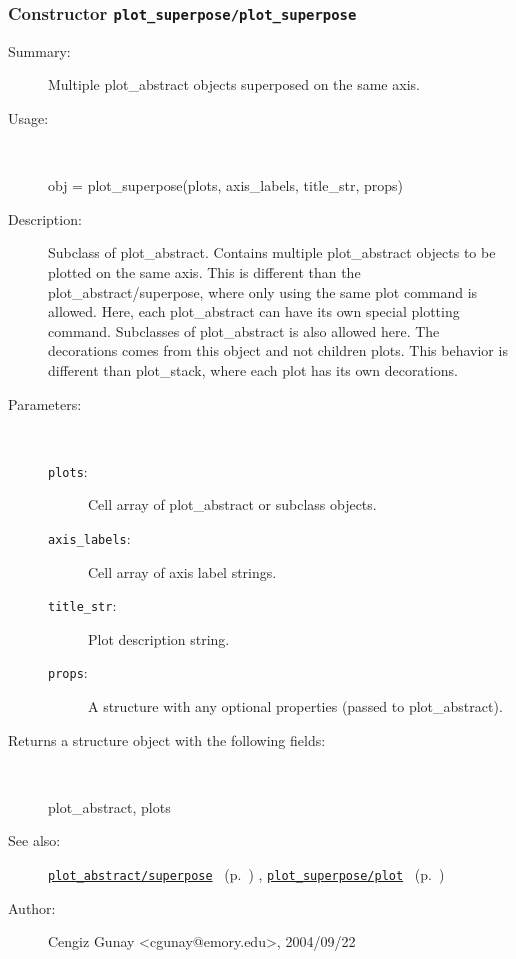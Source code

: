 \subsubsection[Constructor \texttt{plot\_superpose}]{Constructor \texttt{plot\_superpose/plot\_superpose}}%
%
\label{ref_plot_superpose__plot_superpose}%
\hypertarget{ref_plot_superpose__plot_superpose}{}%
\begin{description}
\item[Summary:]Multiple plot\_abstract objects superposed on the same axis.
%
\item[Usage:]~%
\begin{lyxcode}%
obj = plot\_superpose(plots, axis\_labels, title\_str, props)
%
\end{lyxcode}%
%
\item[Description:]%
Subclass of plot\_abstract. Contains multiple plot\_abstract objects
 to be plotted on the same axis. This is different than the 
 plot\_abstract/superpose, where only using the same plot command is allowed.
 Here, each plot\_abstract can have its own special plotting command. Subclasses
 of plot\_abstract is also allowed here. The decorations comes from this object
 and not children plots. This behavior is different than plot\_stack, where
 each plot has its own decorations.
\item[Parameters:]~
\begin{description}%
\item[\texttt{plots}:]
 Cell array of plot\_abstract or subclass objects.
\item[\texttt{axis\_labels}:]
 Cell array of axis label strings.
\item[\texttt{title\_str}:]
 Plot description string.
\item[\texttt{props}:]
 A structure with any optional properties (passed to plot\_abstract).
\end{description}%
%
\item[Returns a structure object with the following fields:]~

	plot\_abstract, plots
%
%
\item[See also:]%
\hyperlink{ref_plot_abstract__superpose}{\texttt{plot\_abstract/superpose}}%
\ (p.~\pageref{ref_plot_abstract__superpose})%
%
, \hyperlink{ref_plot_superpose__plot}{\texttt{plot\_superpose/plot}}%
\ (p.~\pageref{ref_plot_superpose__plot})%
%
%
\item[Author:]%
Cengiz Gunay <cgunay@emory.edu>, 2004/09/22%
\end{description}
\methodline%
